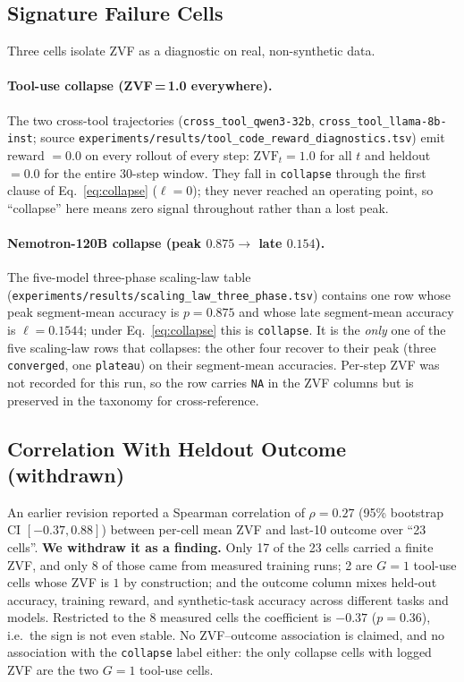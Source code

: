 \subsection{Signature Failure Cells}

Three cells isolate ZVF as a diagnostic on real, non-synthetic data.

\paragraph{Tool-use collapse (ZVF\,=\,1.0 everywhere).}
The two cross-tool trajectories (\texttt{cross\_tool\_qwen3-32b},
\texttt{cross\_tool\_llama-8b-inst}; source
\texttt{experiments/results/tool\_code\_reward\_diagnostics.tsv})
emit reward $= 0.0$ on every rollout of every step: $\mathrm{ZVF}_t
= 1.0$ for all $t$ and heldout $= 0.0$ for the entire
30-step window. They fall in \texttt{collapse} through the first clause
of Eq.~\ref{eq:collapse} ($\ell = 0$); they never reached an operating point,
so ``collapse'' here means zero signal throughout rather than a lost peak.

\paragraph{Nemotron-120B collapse (peak $0.875 \to$ late $0.154$).}
The five-model three-phase scaling-law table
(\texttt{experiments/results/scaling\_law\_three\_phase.tsv})
contains one row whose peak segment-mean accuracy is $p = 0.875$ and
whose late segment-mean accuracy is $\ell = 0.1544$; under
Eq.~\ref{eq:collapse} this is \texttt{collapse}. It is the \emph{only}
one of the five scaling-law rows that collapses: the other four recover
to their peak (three \texttt{converged}, one \texttt{plateau}) on their
segment-mean accuracies. Per-step ZVF was not recorded for this run, so
the row carries \texttt{NA} in the ZVF columns but is preserved in the
taxonomy for cross-reference.

\subsection{Correlation With Heldout Outcome (withdrawn)}
\label{sec:zvf-cross-experiment:corr}

An earlier revision reported a Spearman correlation of $\rho=0.27$
(95\% bootstrap CI $[-0.37,0.88]$) between per-cell mean ZVF and last-10
outcome over ``23 cells''. \textbf{We withdraw it as a finding.} Only 17
of the 23 cells carried a finite ZVF, and only 8 of those came from measured
training runs; 2 are $G{=}1$ tool-use cells whose ZVF is $1$ by construction; and
the outcome column mixes held-out accuracy, training reward, and synthetic-task
accuracy across different tasks and models. Restricted to the 8 measured cells
the coefficient is $-0.37$ ($p=0.36$), i.e.\ the sign is not even stable. No ZVF--outcome
association is claimed, and no association with the \texttt{collapse} label
either: the only collapse cells with logged ZVF are the two $G{=}1$ tool-use
cells.


